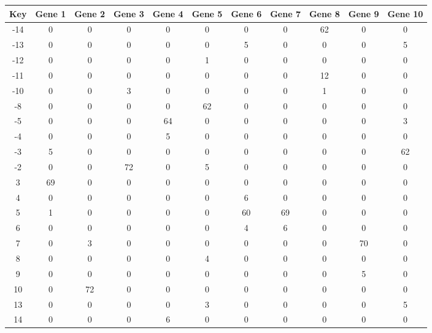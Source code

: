 \begin{tabular}{|c|c|c|c|c|c|c|c|c|c|c|}
\hline
Key & Gene 1 & Gene 2 & Gene 3 & Gene 4 & Gene 5 & Gene 6 & Gene 7 & Gene 8 & Gene 9 & Gene 10 \\
\hline
-14 & 0 & 0 & 0 & 0 & 0 & 0 & 0 & 62 & 0 & 0 \\
-13 & 0 & 0 & 0 & 0 & 0 & 5 & 0 & 0 & 0 & 5 \\
-12 & 0 & 0 & 0 & 0 & 1 & 0 & 0 & 0 & 0 & 0 \\
-11 & 0 & 0 & 0 & 0 & 0 & 0 & 0 & 12 & 0 & 0 \\
-10 & 0 & 0 & 3 & 0 & 0 & 0 & 0 & 1 & 0 & 0 \\
-8 & 0 & 0 & 0 & 0 & 62 & 0 & 0 & 0 & 0 & 0 \\
-5 & 0 & 0 & 0 & 64 & 0 & 0 & 0 & 0 & 0 & 3 \\
-4 & 0 & 0 & 0 & 5 & 0 & 0 & 0 & 0 & 0 & 0 \\
-3 & 5 & 0 & 0 & 0 & 0 & 0 & 0 & 0 & 0 & 62 \\
-2 & 0 & 0 & 72 & 0 & 5 & 0 & 0 & 0 & 0 & 0 \\
3 & 69 & 0 & 0 & 0 & 0 & 0 & 0 & 0 & 0 & 0 \\
4 & 0 & 0 & 0 & 0 & 0 & 6 & 0 & 0 & 0 & 0 \\
5 & 1 & 0 & 0 & 0 & 0 & 60 & 69 & 0 & 0 & 0 \\
6 & 0 & 0 & 0 & 0 & 0 & 4 & 6 & 0 & 0 & 0 \\
7 & 0 & 3 & 0 & 0 & 0 & 0 & 0 & 0 & 70 & 0 \\
8 & 0 & 0 & 0 & 0 & 4 & 0 & 0 & 0 & 0 & 0 \\
9 & 0 & 0 & 0 & 0 & 0 & 0 & 0 & 0 & 5 & 0 \\
10 & 0 & 72 & 0 & 0 & 0 & 0 & 0 & 0 & 0 & 0 \\
13 & 0 & 0 & 0 & 0 & 3 & 0 & 0 & 0 & 0 & 5 \\
14 & 0 & 0 & 0 & 6 & 0 & 0 & 0 & 0 & 0 & 0 \\
\hline
\end{tabular}